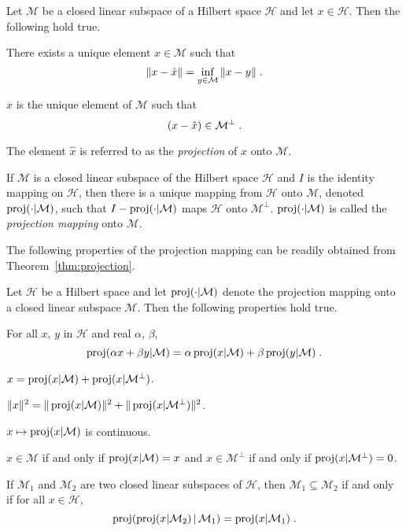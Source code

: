 \begin{thm}
  \label{thm:projection}
  Let $\mathcal{M}$ be a closed linear subspace of a Hilbert space
  $\mathcal{H}$ and let $x \in \mathcal{H}$. Then the following
  hold true.
  \begin{enum_i}
  \item There exists a unique element $\hat{x} \in \mathcal{M}$ such that
$$
\| x - \hat{x} \| = \inf_{y \in \mathcal{M}} \|x-y\| \;.
$$
  \item $\hat{x}$ is the unique element of $\mathcal{M}$ such that
  \[
    (x-\hat{x}) \in \mathcal{M}^\perp \;.
  \]
 \end{enum_i}
  The element $\hat{x}$ is referred to as the \emph{projection}
  of $x$ onto $\mathcal{M}$.
\end{thm}

\begin{cor}
If $\mathcal{M}$ is a closed linear subspace of the Hilbert space $\mathcal{H}$
and $I$ is the identity mapping on $\mathcal{H}$, then there is a
unique mapping from
$\mathcal{H}$ onto $\mathcal{M}$, denoted $\operatorname{proj}({\cdot}|\mathcal{M})$, such that $I-\operatorname{proj}({\cdot}|\mathcal{M})$
maps $\mathcal{H}$ onto $\mathcal{M}^\perp$.
$\operatorname{proj}({\cdot}|\mathcal{M})$ is called the \emph{projection mapping}
onto $\mathcal{M}$.
\end{cor}

The following properties of the projection mapping can be readily
obtained from Theorem~\ref{thm:projection}.

\begin{prop}
\label{prop:properties_projection_mapping}
Let $\mathcal{H}$ be a Hilbert space and let
$\operatorname{proj}({\cdot}|\mathcal{M})$ denote the projection mapping onto a
closed linear subspace $\mathcal{M}$.
Then the following properties hold true.
\begin{enum_i}
\item For all $x$, $y$ in $\mathcal{H}$ and real $\alpha$, $\beta$,
  $$\operatorname{proj}({\alpha x + \beta y}|\mathcal{M})
  = \alpha \operatorname{proj}({x}|\mathcal{M}) + \beta \operatorname{proj}({y}|\mathcal{M})\;.
  $$
\item $x=\operatorname{proj}({x}|\mathcal{M})+\operatorname{proj}({x}|\mathcal{M^\perp})$.
\item \label{item:decomposition_error_projection}
  $\|x \|^2= \| \operatorname{proj}({x}|\mathcal{M}) \|^2
  + \| \operatorname{proj}({x}|\mathcal{M^\perp}) \|^2$.
\item $x \mapsto \operatorname{proj}({x}|\mathcal{M})$ is continuous.
\item $x \in \mathcal{M}$ if and only if $\operatorname{proj}({x}|\mathcal{M})= x$
  and $x \in \mathcal{M}^\perp$ if and only if
  $\operatorname{proj}({x}|\mathcal{M}^\perp)= 0$.
\item If $\mathcal{M}_1$ and $\mathcal{M}_2$ are two closed linear
  subspaces of $\mathcal{H}$, then $\mathcal{M}_1 \subseteq \mathcal{M}_2$
  if and only if for all $x \in \mathcal{H}$,
 \[
  \operatorname{proj}(\operatorname{proj}({x}|\mathcal{M}_2)\,|\,\mathcal{M}_1)
  = \operatorname{proj}({x}|\mathcal{M}_1) \; .
 \]
 \end{enum_i}
\end{prop}

